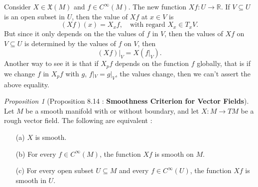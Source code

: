 \documentclass[a4paper]{article}
\theoremstyle{remark}
\newtheorem{prop}{Proposition}
\newcommand{\er}{\mathbb{R}} %
\newcommand{\subhim}{\subseteq} %
\newcommand{\CM}{C^{\infty}(M)} %
\newcommand{\VF}{\mathfrak{X}} %
\newcommand{\Coo}{C^{\infty}}  %
\begin{document}
Consider $X \in \VF(M)$ and $f \in \Coo(M)$. The new function $Xf :U \to \er$. If $V \subhim U$ is an open subset in $U$, then the value of $Xf$ at $x \in V$ is
$$
(Xf)(x) = X_x f, \quad \text{with regard } X_x \in T_xV.
$$
But since it only depends on the the values of $f$ in $V$, then the values of $Xf$ on $V \subhim U$ is determined by the values of $f$ on $V$, then
$$
(Xf)|_V = X(f|_V).
$$
Another way to see it is that if $X_pf$ depends on the function $f$ globally, that is if we change $f$ in $X_pf$ with $g$, $f|_V = g|_V$, the values change, then we can't assert the above equality.
\begin{prop}[Proposition 8.14 \cite{LeeSM} : \textbf{Smoothness Criterion for Vector Fields}]
Let $M$ be a smooth manifold with or without boundary, and let $X : M \to TM$ be a rough vector field. The following are equivalent :
\begin{enumerate}[nolistsep]
\item[(a)] $X$ is smooth.
\item[(b)] For every $f \in \CM$, the function $Xf $ is smooth on $M$.
\item[(c)] For every open subset $U \subhim M$ and every $f \in C^{\infty}(U) $, the function $Xf$ is smooth in $U$. 
\end{enumerate}
\end{prop}
\end{document}
